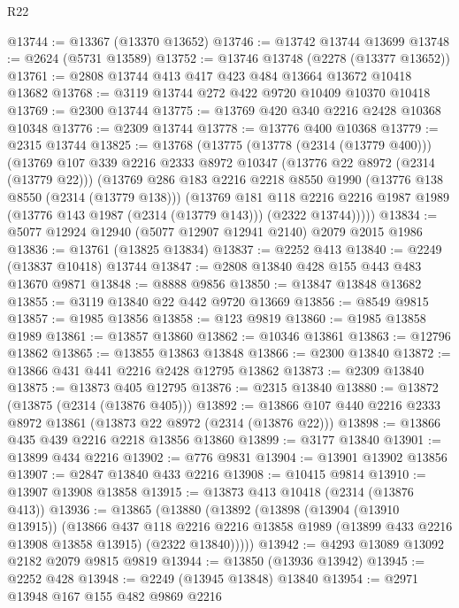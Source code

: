 \begin{lexlean}{R22}
\begin{coremodule}
@13744 := @13367 (@13370 @13652)
@13746 := @13742 @13744 @13699
@13748 := @2624 (@5731 @13589)
@13752 := @13746 @13748 (@2278 (@13377 @13652))
@13761 := @2808 @13744 @413 @417 @423 @484 @13664 @13672 @10418 @13682
@13768 := @3119 @13744 @272 @422 @9720 @10409 @10370 @10418
@13769 := @2300 @13744
@13775 := @13769 @420 @340 @2216 @2428 @10368 @10348
@13776 := @2309 @13744
@13778 := @13776 @400 @10368
@13779 := @2315 @13744
@13825 := @13768
    (@13775
      (@13778 (@2314 (@13779 @400)))
      (@13769
        @107
        @339
        @2216
        @2333
        @8972
        @10347
        (@13776 @22 @8972 (@2314 (@13779 @22)))
        (@13769
          @286
          @183
          @2216
          @2218
          @8550
          @1990
          (@13776 @138 @8550 (@2314 (@13779 @138)))
          (@13769
            @181
            @118
            @2216
            @2216
            @1987
            @1989
            (@13776 @143 @1987 (@2314 (@13779 @143)))
            (@2322 @13744)))))
@13834 := @5077 @12924 @12940 (@5077 @12907 @12941 @2140) @2079 @2015 @1986
@13836 := @13761 (@13825 @13834)
@13837 := @2252 @413
@13840 := @2249 (@13837 @10418) @13744
@13847 := @2808 @13840 @428 @155 @443 @483 @13670 @9871
@13848 := @8888 @9856
@13850 := @13847 @13848 @13682
@13855 := @3119 @13840 @22 @442 @9720 @13669
@13856 := @8549 @9815
@13857 := @1985 @13856
@13858 := @123 @9819
@13860 := @1985 @13858 @1989
@13861 := @13857 @13860
@13862 := @10346 @13861
@13863 := @12796 @13862
@13865 := @13855 @13863 @13848
@13866 := @2300 @13840
@13872 := @13866 @431 @441 @2216 @2428 @12795 @13862
@13873 := @2309 @13840
@13875 := @13873 @405 @12795
@13876 := @2315 @13840
@13880 := @13872 (@13875 (@2314 (@13876 @405)))
@13892 := @13866 @107 @440 @2216 @2333 @8972 @13861 (@13873 @22 @8972 (@2314 (@13876 @22)))
@13898 := @13866 @435 @439 @2216 @2218 @13856 @13860
@13899 := @3177 @13840
@13901 := @13899 @434 @2216
@13902 := @776 @9831
@13904 := @13901 @13902 @13856
@13907 := @2847 @13840 @433 @2216
@13908 := @10415 @9814
@13910 := @13907 @13908 @13858
@13915 := @13873 @413 @10418 (@2314 (@13876 @413))
@13936 := @13865
    (@13880
      (@13892
        (@13898
          (@13904 (@13910 @13915))
          (@13866
            @437
            @118
            @2216
            @2216
            @13858
            @1989
            (@13899 @433 @2216 @13908 @13858 @13915)
            (@2322 @13840)))))
@13942 := @4293 @13089 @13092 @2182 @2079 @9815 @9819
@13944 := @13850 (@13936 @13942)
@13945 := @2252 @428
@13948 := @2249 (@13945 @13848) @13840
@13954 := @2971 @13948 @167 @155 @482 @9869 @2216

\end{coremodule}
\end{lexlean}
